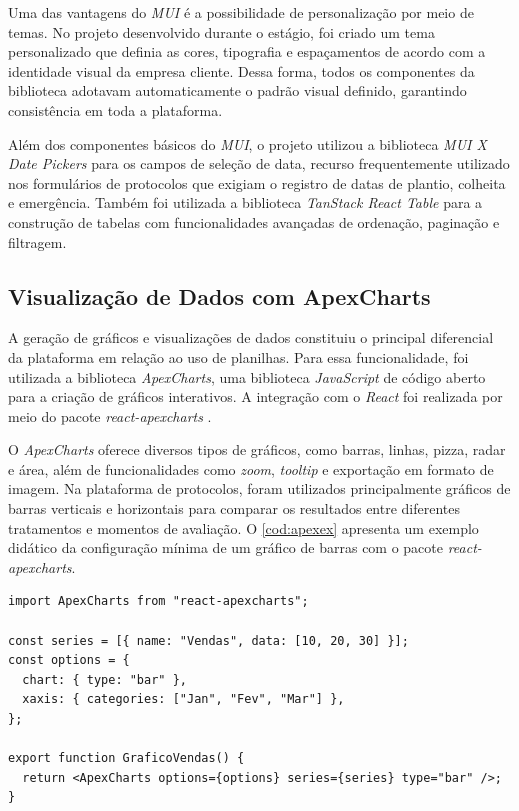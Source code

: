 Uma das vantagens do \textit{MUI} é a possibilidade de personalização por meio de temas. No projeto desenvolvido durante o estágio, foi criado um tema personalizado que definia as cores, tipografia e espaçamentos de acordo com a identidade visual da empresa cliente. Dessa forma, todos os componentes da biblioteca adotavam automaticamente o padrão visual definido, garantindo consistência em toda a plataforma.

Além dos componentes básicos do \textit{MUI}, o projeto utilizou a biblioteca \textit{MUI X Date Pickers} para os campos de seleção de data, recurso frequentemente utilizado nos formulários de protocolos que exigiam o registro de datas de plantio, colheita e emergência. Também foi utilizada a biblioteca \textit{TanStack React Table} para a construção de tabelas com funcionalidades avançadas de ordenação, paginação e filtragem.

\subsection{Visualização de Dados com ApexCharts}

A geração de gráficos e visualizações de dados constituiu o principal diferencial da plataforma em relação ao uso de planilhas. Para essa funcionalidade, foi utilizada a biblioteca \textit{ApexCharts}, uma biblioteca \textit{JavaScript} de código aberto para a criação de gráficos interativos. A integração com o \textit{React} foi realizada por meio do pacote \textit{react-apexcharts} \cite{ApexCharts2024}.

O \textit{ApexCharts} oferece diversos tipos de gráficos, como barras, linhas, pizza, radar e área, além de funcionalidades como \textit{zoom}, \textit{tooltip} e exportação em formato de imagem. Na plataforma de protocolos, foram utilizados principalmente gráficos de barras verticais e horizontais para comparar os resultados entre diferentes tratamentos e momentos de avaliação. O \autoref{cod:apexex} apresenta um exemplo didático da configuração mínima de um gráfico de barras com o pacote \textit{react-apexcharts}.

\begin{lstlisting}[caption={Exemplo didático de gráfico de barras com \textit{react-apexcharts}.}, label={cod:apexex}]
import ApexCharts from "react-apexcharts";

const series = [{ name: "Vendas", data: [10, 20, 30] }];
const options = {
  chart: { type: "bar" },
  xaxis: { categories: ["Jan", "Fev", "Mar"] },
};

export function GraficoVendas() {
  return <ApexCharts options={options} series={series} type="bar" />;
}
\end{lstlisting}

